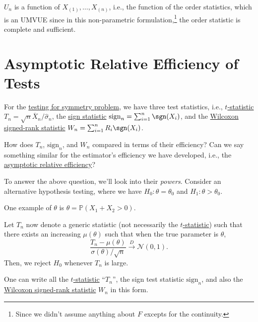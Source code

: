 \begin{remark}
	\(U_n\) is a function of \(X_{(1)}, \dots , X_{(n)}\), i.e., the function of the order statistics, which is an UMVUE since in this non-parametric formulation,\footnote{Since we didn't assume anything about \(F\) excepts for the continuity.} the order statistic is complete and sufficient.
\end{remark}

\section{Asymptotic Relative Efficiency of Tests}
For the \hyperref[prb:testing-symmetry]{testing for symmetry problem}, we have three test statistics, i.e., \hyperref[def:t-statistic]{ \(t\)-statistic} \(T_n = \sqrt{n} \overline{X} _n / \hat{\sigma} _n\), the \hyperref[def:sign-statistic]{sign statistic} \(\mathrm{sign} _n = \sum_{i=1}^{n} \sgn (X_i) \), and the \hyperref[def:Wilcoxon-signed-rank-statistic]{Wilcoxon signed-rank statistic} \(W_n = \sum_{i=1}^{n} R_i \sgn (X_i)\).

\begin{problem*}
	How does \(T_n\), \(\mathrm{sign} _n\), and \(W_n\) compared in terms of their efficiency? Can we say something similar for the estimator's efficiency we have developed, i.e., the \hyperref[def:asymptotic-relative-efficiency-estimator]{asymptotic relative efficiency}?
\end{problem*}

To answer the above question, we'll look into their \emph{powers}. Consider an alternative hypothesis testing, where we have \(H_0 \colon \theta = \theta _0\) and \(H_1 \colon \theta > \theta _0\).

\begin{eg}
	One example of \(\theta \) is \(\theta = \mathbb{P} (X_1 + X_2 > 0)\).
\end{eg}

Let \(T_n\) now denote a generic statistic (not necessarily the \hyperref[def:t-statistic]{\(t\)-statistic}) such that there exists an increasing \(\mu (\theta )\) such that when the true parameter is \(\theta \),
\[
	\frac{T_n - \mu (\theta )}{\sigma (\theta ) / \sqrt{n} }
	\overset{D}{\to} \mathcal{N} (0, 1).
\]
Then, we reject \(H_0\) whenever \(T_n\) is large.

\begin{eg}
	One can write all the \hyperref[def:t-statistic]{\(t\)-statistic} ``\(T_n\)'', the sign test statistic \(\mathrm{sign} _n\), and also the \hyperref[def:Wilcoxon-signed-rank-statistic]{Wilcoxon signed-rank statistic} \(W_n\) in this form.
\end{eg}

